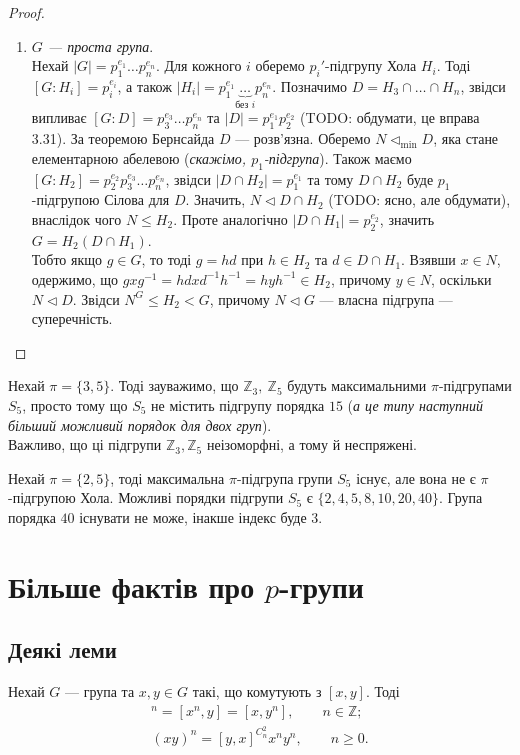 \documentclass{math_library}
\begin{document}
\begin{proof}
\begin{enumerate}[wide=0pt,label={\Roman*.}]
\item \textit{$G$ --- проста група}.\\
Нехай $|G| = p_1^{e_1} \dots p_n^{e_n}$. Для кожного $i$ оберемо $p_i'$-підгрупу Хола $H_i$. Тоді $[G:H_i] = p_i^{e_i}$, а також $|H_i| = p_1^{e_1} \underbrace{\dots}_{\text{без $i$}} p_n^{e_n}$. Позначимо $D = H_3 \cap \dots \cap H_n$, звідси випливає $[G:D] = p_3^{e_3} \dots p_n^{e_n}$ та $|D| = p_1^{e_1} p_2^{e_2}$ (TODO: обдумати, це вправа 3.31). За теоремою Бернсайда $D$ --- розв'язна. Оберемо $N \triangleleft_{\text{min}} D$, яка стане елементарною абелевою (\textit{скажімо, $p_1$-підгрупа}). Також маємо $[G:H_2] = p_2^{e_2} p_3^{e_3} \dots p_n^{e_n}$, звідси $|D \cap H_2| = p_1^{e_1}$ та тому $D \cap H_2$ буде $p_1$-підгрупою Сілова для $D$. Значить, $N \triangleleft D \cap H_2$ (TODO: ясно, але обдумати), внаслідок чого $N \leq H_2$. Проте аналогічно $|D \cap H_1| = p_2^{e_2}$, значить $G = H_2(D \cap H_1)$.\\
Тобто якщо $g \in G$, то тоді $g = hd$ при $h \in H_2$ та $d \in D \cap H_1$. Взявши $x \in N$, одержимо, що $gxg^{-1} = hdxd^{-1}h^{-1} = hyh^{-1} \in H_2$, причому $y \in N$, оскільки $N \triangleleft D$. Звідси $N^G \leq H_2 < G$, причому $N \triangleleft G$ --- власна підгрупа --- суперечність. \qedhere
\end{enumerate}
\end{proof}

\begin{remark}
Нехай $\pi = \{3,5\}$. Тоді зауважимо, що $\mathbb{Z}_3,\ \mathbb{Z}_5$ будуть максимальними $\pi$-підгрупами $S_5$, просто тому що $S_5$ не містить підгрупу порядка $15$ (\textit{а це типу наступний більший можливий порядок для двох груп}).\\
Важливо, що ці підгрупи $\mathbb{Z}_3,\mathbb{Z}_5$ неізоморфні, а тому й неспряжені.
\end{remark}

\begin{remark}
Нехай $\pi = \{2,5\}$, тоді максимальна $\pi$-підгрупа групи $S_5$ існує, але вона не є $\pi$-підгрупою Хола. Можливі порядки підгрупи $S_5$ є $\{2,4,5,8,10,20,40\}$. Група порядка $40$ існувати не може, інакше індекс буде $3$.
\end{remark}
\newpage

\section{Більше фактів про $p$-групи}
\subsection{Деякі леми}
\begin{lemma}
Нехай $G$ --- група та $x,y \in G$ такі, що комутують з $[x,y]$. Тоді
\begin{align*}
[x,y]^n = [x^n,y] = [x,y^n], \qquad n \in \mathbb{Z}; \\
(xy)^n = [y,x]^{C_n^2} x^n y^n, \qquad n \geq 0.
\end{align*}
\end{lemma}
\end{document}
